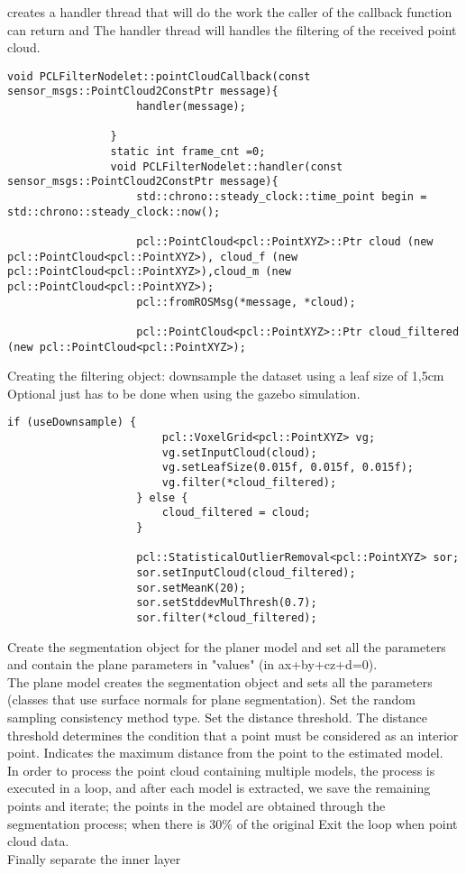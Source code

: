 			
			
			creates a handler thread that will do the work the caller of the callback function can return and The handler thread will handles the filtering of the received point cloud.
			\begin{lstlisting}[caption={}]
				void PCLFilterNodelet::pointCloudCallback(const sensor_msgs::PointCloud2ConstPtr message){
					handler(message);
					
				}
				static int frame_cnt =0;
				void PCLFilterNodelet::handler(const sensor_msgs::PointCloud2ConstPtr message){
					std::chrono::steady_clock::time_point begin = std::chrono::steady_clock::now();
					
					pcl::PointCloud<pcl::PointXYZ>::Ptr cloud (new pcl::PointCloud<pcl::PointXYZ>), cloud_f (new pcl::PointCloud<pcl::PointXYZ>),cloud_m (new pcl::PointCloud<pcl::PointXYZ>);
					pcl::fromROSMsg(*message, *cloud);
					
					pcl::PointCloud<pcl::PointXYZ>::Ptr cloud_filtered (new pcl::PointCloud<pcl::PointXYZ>);
				\end{lstlisting}
				
				
				Creating the filtering object: downsample the dataset using a leaf size of 1,5cm Optional just has to be done when using the gazebo simulation.
				\begin{lstlisting}[caption={}]
					if (useDownsample) {
						pcl::VoxelGrid<pcl::PointXYZ> vg;
						vg.setInputCloud(cloud);
						vg.setLeafSize(0.015f, 0.015f, 0.015f);
						vg.filter(*cloud_filtered);
					} else {
						cloud_filtered = cloud;
					}
					
					pcl::StatisticalOutlierRemoval<pcl::PointXYZ> sor;
					sor.setInputCloud(cloud_filtered);
					sor.setMeanK(20);
					sor.setStddevMulThresh(0.7);
					sor.filter(*cloud_filtered);
				\end{lstlisting}
				
				
				Create the segmentation object for the planer model and set all the parameters and contain the plane parameters in "values" (in ax+by+cz+d=0).\\
				The plane model creates the segmentation object and sets all the parameters (classes that use surface normals for plane segmentation). Set the random sampling consistency method type. Set the distance threshold. The distance threshold determines the condition that a point must be considered as an interior point. Indicates the maximum distance from the point to the estimated model.\\
				In order to process the point cloud containing multiple models, the process is executed in a loop, and after each model is extracted, we save the remaining points and iterate; the points in the model are obtained through the segmentation process; when there is 30\% of the original Exit the loop when point cloud data.\\
				Finally separate the inner layer\\
				
